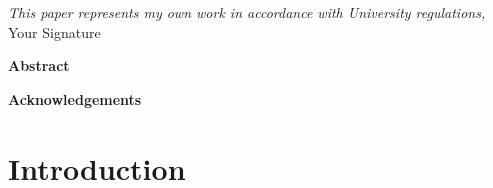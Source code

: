 \documentclass[11pt]{report}
\begin{document}



\thispagestyle{empty}
\vspace*{3in}
\begin{center}
\emph{This paper represents my own work in accordance with University regulations,} \\
Your Signature %
\end{center}
\clearpage

\begin{center}
\Large \textbf{Abstract}
\end{center}
 
 \clearpage

\begin{center}
\Large \textbf{Acknowledgements}
\end{center}

\clearpage

\thispagestyle{empty}
\tableofcontents
\clearpage

\listoffigures 
\listoftables
\clearpage

\fancyhead{}
\fancyfoot{}
\pagestyle{fancyplain}

{\newpage\renewcommand{\thepage}{\arabic{page}}\setcounter{page}{1}}


\section{Introduction \label{sec:introduction}}

% 
\end{document}
